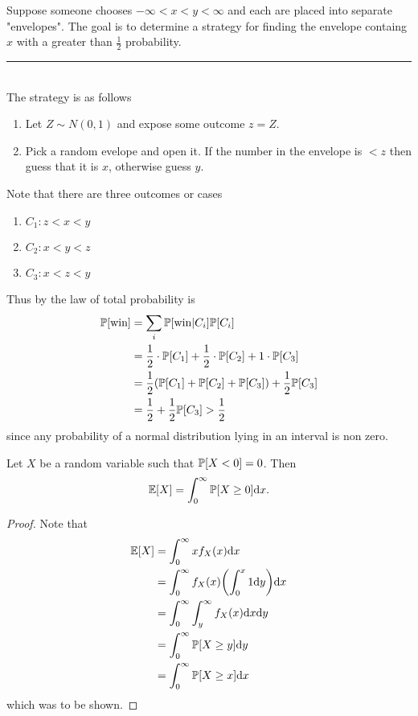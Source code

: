 \documentclass{subfiles}
\begin{document}
\begin{example}
    Suppose someone chooses $-\infty < x < y < \infty$ and each are placed into separate "envelopes". The goal is to determine a strategy for finding the envelope containg $x$ with a greater than $\frac{1}{2}$ probability.
    \\
    \rule{\textwidth}{0.4pt}
    \\
    
    The strategy is as follows
    \begin{enumerate}
        \item Let $Z \sim N(0,1)$ and expose some outcome $z = Z$.
        \item Pick a random evelope and open it. If the number in the envelope is $< z$ then guess that it is $x$, otherwise guess $y$.
    \end{enumerate}

    Note that there are three outcomes or cases
    \begin{enumerate}
        \item $C_1 : z < x < y$
        \item $C_2: x < y < z$
        \item $C_3: x < z < y$
    \end{enumerate}
    Thus by the law of total probability is
    \begin{align*}
        \mathbb{P}\qty[\text{win}] &= \sum_i \mathbb{P}\qty[\text{win} | C_i] \mathbb{P}\qty[C_i] \\
                          &= \frac{1}{2}\cdot \mathbb{P}\qty[C_1] + \frac{1}{2}\cdot \mathbb{P}\qty[C_2] + 1\cdot \mathbb{P}\qty[C_3] \\
                          &= \frac{1}{2} \qty(\mathbb{P}\qty[C_1] + \mathbb{P}\qty[C_2] + \mathbb{P}\qty[C_3]) + \frac{1}{2} \mathbb{P}\qty[C_3] \\
                          &= \frac{1}{2} + \frac{1}{2} \mathbb{P}\qty[C_3] > \frac{1}{2}
    \end{align*}
    since any probability of a normal distribution lying in an interval is non zero.
\end{example}

\begin{theorem}
    Let $X$ be a random variable such that $\mathbb{P}\qty[X < 0] = 0$. Then
    \[
        \mathbb{E}\qty[X] = \int_0^\infty \mathbb{P}\qty[X \geq 0] \dd x
    .\]
\end{theorem}
\begin{proof}
    Note that
    \begin{align*}
        \mathbb{E}\qty[X] &= \int_0^\infty x f_X(x) \dd x \\
                 &= \int_0^\infty f_X(x) \qty(\int_0^x 1 \dd y) \dd x \\
                 &= \int_0^\infty \int_y^\infty f_X(x) \dd x \dd y \\
                 &= \int_0^\infty \mathbb{P}\qty[X \geq y] \dd y \\
                 &= \int_0^\infty \mathbb{P}\qty[X \geq x] \dd x
    \end{align*}
    which was to be shown.
\end{proof}
\end{document}
